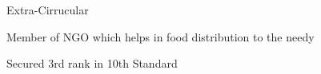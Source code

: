 \begin{cvsection}{Extra-Cirrucular} \itemsep -3pt
\item Member of NGO which helps in food distribution to the needy
\item Secured 3rd rank in 10th Standard

\end{cvsection}